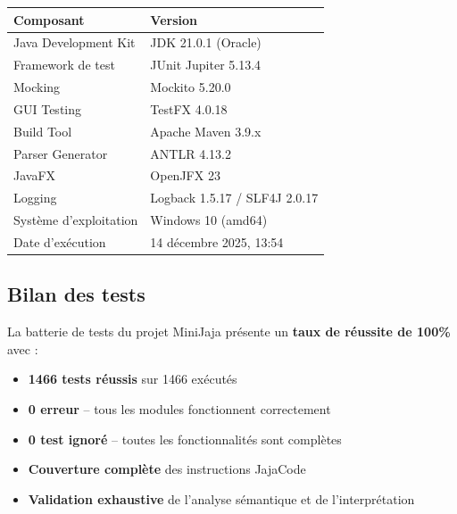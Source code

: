 \begin{center}
\begin{tabular}{|l|l|}
\hline
\rowcolor{headerblue!20}
\textbf{Composant} & \textbf{Version} \\
\hline
Java Development Kit & JDK 21.0.1 (Oracle) \\
\hline
Framework de test & JUnit Jupiter 5.13.4 \\
\hline
Mocking & Mockito 5.20.0 \\
\hline
GUI Testing & TestFX 4.0.18 \\
\hline
Build Tool & Apache Maven 3.9.x \\
\hline
Parser Generator & ANTLR 4.13.2 \\
\hline
JavaFX & OpenJFX 23 \\
\hline
Logging & Logback 1.5.17 / SLF4J 2.0.17 \\
\hline
Système d'exploitation & Windows 10 (amd64) \\
\hline
Date d'exécution & 14 décembre 2025, 13:54 \\
\hline
\end{tabular}
\end{center}

\subsection{Bilan des tests}

La batterie de tests du projet MiniJaja présente un \textbf{taux de réussite de 100\%} avec :

\begin{itemize}
    \item \textbf{1466 tests réussis} sur 1466 exécutés
    \item \textbf{0 erreur} -- tous les modules fonctionnent correctement
    \item \textbf{0 test ignoré} -- toutes les fonctionnalités sont complètes
    \item \textbf{Couverture complète} des instructions JajaCode
    \item \textbf{Validation exhaustive} de l'analyse sémantique et de l'interprétation
\end{itemize}

\vspace{0.5cm}

\begin{center}
\end{center}

